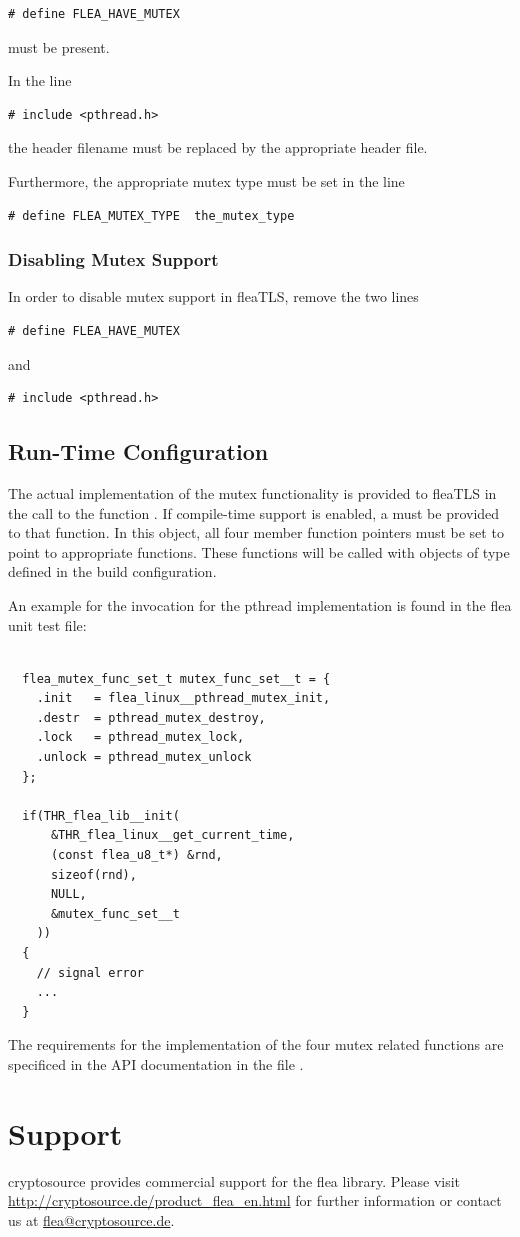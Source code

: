 \documentclass[a4paper,11pt]{scrartcl}
\begin{document}
\begin{verbatim}
# define FLEA_HAVE_MUTEX
\end{verbatim}
must be present.

In the line
\begin{verbatim}
# include <pthread.h>
\end{verbatim}
the header filename must be replaced by the appropriate header file.

Furthermore, the appropriate mutex type must be set in the line 
\begin{verbatim}
# define FLEA_MUTEX_TYPE  the_mutex_type
\end{verbatim}

\subsubsection{Disabling Mutex Support}
In order to disable mutex support in fleaTLS, remove the two lines
\begin{verbatim}
# define FLEA_HAVE_MUTEX
\end{verbatim}
and
\begin{verbatim}
# include <pthread.h>
\end{verbatim}

\subsection{Run-Time Configuration}

The actual implementation of the mutex functionality is provided to fleaTLS in
the call to the function \funcLibInit. If compile-time support is enabled, a
 must be provided to that function. In this object,
all four member function pointers must be set to point to appropriate functions.
These functions will be called with objects of type 
defined in the build configuration.

An example for the invocation \funcLibInit for the pthread implementation is
found in the flea unit test file:
\begin{lstlisting}

  flea_mutex_func_set_t mutex_func_set__t = {
    .init   = flea_linux__pthread_mutex_init,
    .destr  = pthread_mutex_destroy,
    .lock   = pthread_mutex_lock,
    .unlock = pthread_mutex_unlock
  };

  if(THR_flea_lib__init(
      &THR_flea_linux__get_current_time,
      (const flea_u8_t*) &rnd,
      sizeof(rnd),
      NULL,
      &mutex_func_set__t
    ))
  {
    // signal error
    ...
  }
  \end{lstlisting}

  The requirements for the implementation of the four mutex related functions
  are specificed in the API documentation in the file .


  
  \section{Support}
cryptosource provides commercial support for the flea library. Please visit
\url{http://cryptosource.de/product_flea_en.html} for further information or
contact us at \url{flea@cryptosource.de}.
\end{document}
